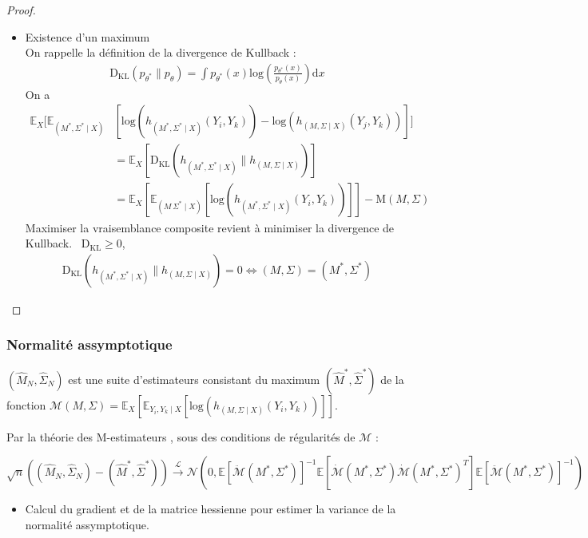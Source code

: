 \documentclass[11pt,table]{beamer}
\begin{document}
\begin{frame}
\begin{proof}
\begin{itemize}
\item Existence d'un maximum \\
On rappelle la définition de la divergence de Kullback :
\begin{align*}
\mathrm{D_{KL}}(p_{\theta^\ast} \parallel p_{\theta})= \int p_{\theta^\ast}(x) \mathrm{log}(\frac{p_{\theta^\ast}(x)}{p_{\theta}(x)}) \mathrm{d}x
\end{align*}
On a 
\begin{align*}
\mathbb{E}_X[\mathbb{E}_{(M^{\ast},\Sigma^{\ast} \mid X)}&[\mathrm{log}(h_{(M^{\ast},\Sigma^{\ast} \mid X)}(Y_i,Y_k)) - \mathrm{log}(h_{(M,\Sigma\mid X)}(Y_j,Y_k))]] \\
& = \mathbb{E}_X[\mathrm{D_{KL}}(h_{(M^\ast,\Sigma^\ast \mid X)}\parallel h_{(M,\Sigma \mid X)})]\\
& = \mathbb{E}_X[\mathbb{E}_{(M\,\Sigma^{\ast} \mid X)}[\mathrm{log}(h_{(M^{\ast},\Sigma^{\ast} \mid X)}(Y_i,Y_k))]] - \mathrm{M}(M,\Sigma)
\end{align*}
Maximiser la vraisemblance composite revient à minimiser la divergence de Kullback. \
$\mathrm{D_{KL}} \geq 0$, 
\begin{align*}
\mathrm{D_{KL}}(h_{(M^\ast,\Sigma^\ast \mid X)}\parallel h_{(M,\Sigma \mid X)}) = 0 
\Leftrightarrow
(M,\Sigma) = (M^\ast, \Sigma^\ast)
\end{align*}

\end{itemize}
\end{proof}
\end{frame}
\begin{frame}
\frametitle{Normalité assymptotique}
 $(\widehat{M}_N,\widehat\Sigma_N)$ est une suite d'estimateurs consistant du maximum $(\widehat{M}^\ast,\widehat{\Sigma}^\ast)$ de la fonction $\mathcal{M}(M,\Sigma) = \mathbb{E}_X [\mathbb{E}_{Y_i,Y_k \mid X} [ \mathrm{log}(h_{(M,\Sigma \mid X)} (Y_i,Y_k))]]$.\\
\vspace{0.5cm}
 
Par la théorie des M-estimateurs \cite{vaart_1998}, sous des conditions de régularités de $\mathcal{M}$ :\\
\begin{center}
$ \sqrt{n}((\widehat{M}_N,\widehat\Sigma_N) - (\widehat{M}^\ast,\widehat{\Sigma}^\ast)) \overset{\mathcal{L}}{\longrightarrow} \mathcal{N}(0, \mathbb{E}[\ddot{\mathcal{M}}(M^\ast, \Sigma^\ast)]^{-1} \mathbb{E}[ \dot{\mathcal{M}}(M^\ast,\Sigma^\ast) \dot{\mathcal{M}}(M^\ast,\Sigma^\ast)^T ]\mathbb{E}[\ddot{\mathcal{M}}(M^\ast, \Sigma^\ast)]^{-1} ) $
\end{center}
\begin{itemize}
\item Calcul du gradient et de la matrice hessienne pour estimer la variance de la normalité assymptotique.
\end{itemize}
 
\end{frame}
\end{document}
